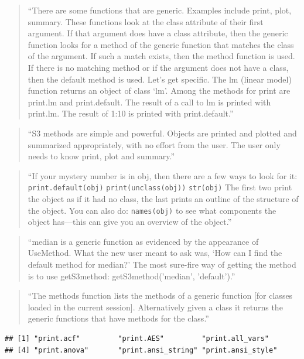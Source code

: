 \documentclass[]{tufte-book}
\begin{document}
\begin{quote}
``There are some functions that are generic. Examples include print, plot,
summary. These functions look at the class attribute of their first argument. If
that argument does have a class attribute, then the generic function looks for a
method of the generic function that matches the class of the argument. If such a
match exists, then the method function is used. If there is no matching method
or if the argument does not have a class, then the default method is used.
Let's get specific. The lm (linear model) function returns an object of class
`lm'. Among the methods for print are print.lm and print.default. The
result of a call to lm is printed with print.lm. The result of 1:10 is printed
with print.default.''
\citep{burns2011r}
\end{quote}

\begin{quote}
``S3 methods are simple and powerful. Objects are printed and plotted and
summarized appropriately, with no effort from the user. The user only needs to
know print, plot and summary.'' \citep{burns2011r}
\end{quote}

\begin{quote}
``If your mystery number is in obj, then there are a few
ways to look for it:
\texttt{print.default(obj)}
\texttt{print(unclass(obj))}
\texttt{str(obj)}
The first two print the object as if it had no class, the last prints an outline of
the structure of the object. You can also do:
\texttt{names(obj)}
to see what components the object has---this can give you an overview of the
object.'' \citep{burns2011r}
\end{quote}

\begin{quote}
``median is a generic
function as evidenced by the appearance of UseMethod. What the new user
meant to ask was, `How can I find the default method for median?'
The most sure-fire way of getting the method is to use getS3method:
getS3method('median', 'default').'' \citep{burns2011r}
\end{quote}

\begin{quote}
``The methods function lists the methods of a generic function {[}for classes loaded in the current session{]}. Alternatively
given a class it returns the generic functions that have methods for the class.'' \citep{burns2011r}
\end{quote}

\begin{verbatim}
## [1] "print.acf"         "print.AES"         "print.all_vars"   
## [4] "print.anova"       "print.ansi_string" "print.ansi_style"
\end{verbatim}
\end{document}
